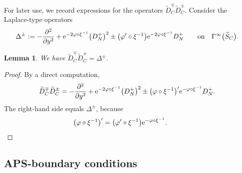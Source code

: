 \documentclass[10pt,a4paper]{amsart}
\numberwithin{equation}{section}
\newtheorem{Lemma}[Theorem]{Lemma}
\begin{document}
For later use, we record expressions for the operators $\widetilde{D}_C^{\mp}\widetilde{D}_C^{\pm}$.
Consider the Laplace-type operators
\begin{equation*}%
\Delta^{\pm} := -\frac{\partial^2}{\partial y^2} + {\rm e}^{-2 \varphi \circ \xi^{-1}} \big(D_N^+\big)^2 \pm \big(\varphi' \circ \xi^{-1}\big) {\rm e}^{-2 \varphi \circ \xi^{-1}} D_N^+\qquad
 \text{on}\quad \Gamma^{\infty}\big(\widetilde{S}_C\big) .
\end{equation*}

\begin{Lemma}\label{lem D02}
We have $\widetilde{D}_C^{\mp}\widetilde{D}_C^{\pm} = \Delta^{\pm}$.
\end{Lemma}
\begin{proof}
By a direct computation,
\[
\widetilde{D}_C^{\mp}\widetilde{D}_C^{\pm} =
-\frac{\partial^2}{\partial y^2} + {\rm e}^{-2\varphi \circ \xi^{-1}} \big(D_N^+\big)^2 \pm \big(\varphi \circ \xi^{-1}\big)' {\rm e}^{-\varphi\circ \xi^{-1}} D_N^+.
\]
The right-hand side equals $\Delta^{\pm}$, because
\begin{equation*}
 \big(\varphi \circ \xi^{-1}\big)' = \big(\varphi' \circ \xi^{-1}\big) {\rm e}^{-\varphi \circ \xi^{-1}}.\tag*{\qed}
\end{equation*}
\renewcommand{\qed}{}
\end{proof}

\subsection{APS-boundary conditions}
\end{document}
